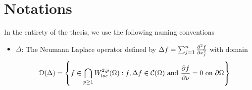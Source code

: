 \section{Notations}

In the entirety of the thesis, we use the following naming conventions

\begin{itemize}
    \item $\Delta$: The Neumann Laplace operator defined by $\Delta f = \sum_{j = 1}^n \frac{\partial^2 f}{\partial x_j^2}$ with domain $$\EuScript{D}(\Delta) = \left\{ f \in \bigcap_{p\ge 1} W_{loc}^{2, p}(\Omega) : f, \Delta f \in \mathcal{C}(\Omega) \text{ and } \frac{\partial f}{\partial \nu} = 0 \text{ on } \partial\Omega \right\}$$
\end{itemize}